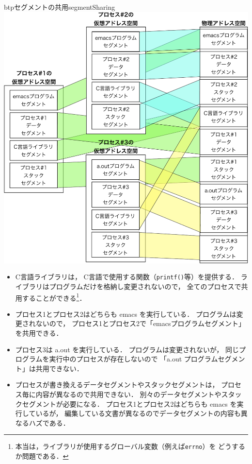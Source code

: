 \begin{myfig}{btp}{セグメントの共用}{segmentSharing}
  \includegraphics[scale=0.66]{Fig/segmentSharing-crop.pdf}
\end{myfig}

\begin{itemize}
\item C言語ライブラリは，
  C言語で使用する関数（\texttt{printf()}等）を提供する．
  ライブラリはプログラムだけを格納し変更されないので，
  全てのプロセスで共用することができる\footnote{
    本当は，ライブラリが使用するグローバル変数（例えば\texttt{errno}）を
    どうするか問題である．
  }．

\item プロセス1とプロセス2はどちらも emacs を実行している．
  プログラムは変更されないので，
  プロセス1とプロセス2で「emacsプログラムセグメント」を共用できる．

\item プロセス3は a.out を実行している．
  プログラムは変更されないが，
  同じプログラムを実行中のプロセスが存在しないので
  「a.out プログラムセグメント」は共用できない．

\item プロセスが書き換えるデータセグメントやスタックセグメントは，
  プロセス毎に内容が異なるので共用できない．
  別々のデータセグメントやスタックセグメントが必要になる．
  プロセス1とプロセス2はどちらも emacs を実行しているが，
  編集している文書が異なるのでデータセグメントの内容も異なるハズである．
\end{itemize}

